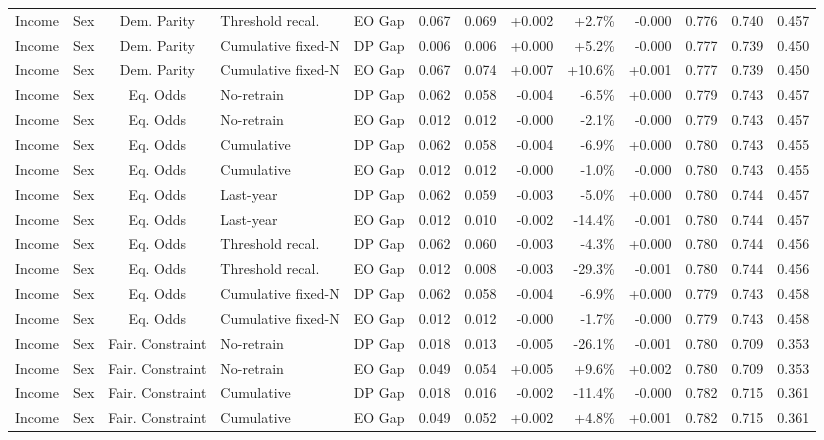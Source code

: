 \begin{longtable}{llcllrrrrrrrr}
Income & Sex & Dem. Parity & Threshold recal. & EO Gap & 0.067 & 0.069 & +0.002 & +2.7\% & -0.000 & 0.776 & 0.740 & 0.457 \\
Income & Sex & Dem. Parity & Cumulative fixed-N & DP Gap & 0.006 & 0.006 & +0.000 & +5.2\% & -0.000 & 0.777 & 0.739 & 0.450 \\
Income & Sex & Dem. Parity & Cumulative fixed-N & EO Gap & 0.067 & 0.074 & +0.007 & +10.6\% & +0.001 & 0.777 & 0.739 & 0.450 \\
Income & Sex & Eq. Odds & No-retrain & DP Gap & 0.062 & 0.058 & -0.004 & -6.5\% & +0.000 & 0.779 & 0.743 & 0.457 \\
Income & Sex & Eq. Odds & No-retrain & EO Gap & 0.012 & 0.012 & -0.000 & -2.1\% & -0.000 & 0.779 & 0.743 & 0.457 \\
Income & Sex & Eq. Odds & Cumulative & DP Gap & 0.062 & 0.058 & -0.004 & -6.9\% & +0.000 & 0.780 & 0.743 & 0.455 \\
Income & Sex & Eq. Odds & Cumulative & EO Gap & 0.012 & 0.012 & -0.000 & -1.0\% & -0.000 & 0.780 & 0.743 & 0.455 \\
Income & Sex & Eq. Odds & Last-year & DP Gap & 0.062 & 0.059 & -0.003 & -5.0\% & +0.000 & 0.780 & 0.744 & 0.457 \\
Income & Sex & Eq. Odds & Last-year & EO Gap & 0.012 & 0.010 & -0.002 & -14.4\% & -0.001 & 0.780 & 0.744 & 0.457 \\
Income & Sex & Eq. Odds & Threshold recal. & DP Gap & 0.062 & 0.060 & -0.003 & -4.3\% & +0.000 & 0.780 & 0.744 & 0.456 \\
Income & Sex & Eq. Odds & Threshold recal. & EO Gap & 0.012 & 0.008 & -0.003 & -29.3\% & -0.001 & 0.780 & 0.744 & 0.456 \\
Income & Sex & Eq. Odds & Cumulative fixed-N & DP Gap & 0.062 & 0.058 & -0.004 & -6.9\% & +0.000 & 0.779 & 0.743 & 0.458 \\
Income & Sex & Eq. Odds & Cumulative fixed-N & EO Gap & 0.012 & 0.012 & -0.000 & -1.7\% & -0.000 & 0.779 & 0.743 & 0.458 \\
Income & Sex & Fair. Constraint & No-retrain & DP Gap & 0.018 & 0.013 & -0.005 & -26.1\% & -0.001 & 0.780 & 0.709 & 0.353 \\
Income & Sex & Fair. Constraint & No-retrain & EO Gap & 0.049 & 0.054 & +0.005 & +9.6\% & +0.002 & 0.780 & 0.709 & 0.353 \\
Income & Sex & Fair. Constraint & Cumulative & DP Gap & 0.018 & 0.016 & -0.002 & -11.4\% & -0.000 & 0.782 & 0.715 & 0.361 \\
Income & Sex & Fair. Constraint & Cumulative & EO Gap & 0.049 & 0.052 & +0.002 & +4.8\% & +0.001 & 0.782 & 0.715 & 0.361 \\

\end{longtable}
